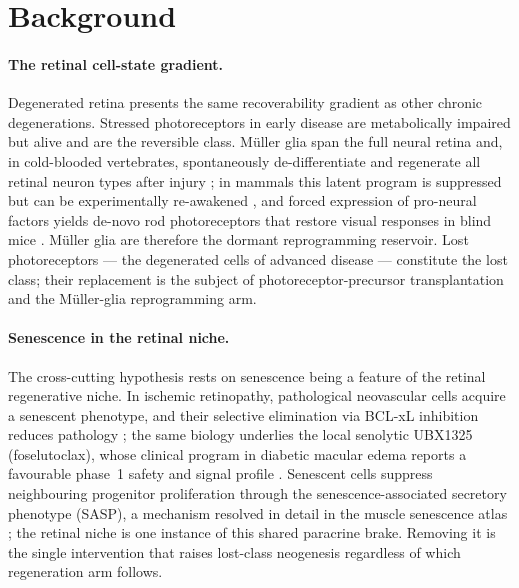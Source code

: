 \documentclass[11pt,a4paper]{article}
\begin{document}
\section{Background}
\label{sec:bg}
\paragraph{The retinal cell-state gradient.} Degenerated retina presents the same recoverability
gradient as other chronic degenerations. Stressed photoreceptors in early disease are
metabolically impaired but alive and are the reversible class. M\"uller glia span the full
neural retina and, in cold-blooded vertebrates, spontaneously de-differentiate and regenerate
all retinal neuron types after injury \citep{goldman2014}; in mammals this latent program is
suppressed but can be experimentally re-awakened \citep{karl2008,jorstad2017}, and forced
expression of pro-neural factors yields de-novo rod photoreceptors that restore visual responses
in blind mice \citep{yao2018}. M\"uller glia are therefore the dormant reprogramming reservoir.
Lost photoreceptors --- the degenerated cells of advanced disease --- constitute the lost class;
their replacement is the subject of photoreceptor-precursor transplantation
\citep{maclaren2006,ribeiro2021} and the M\"uller-glia reprogramming arm.

\paragraph{Senescence in the retinal niche.} The cross-cutting hypothesis rests on senescence
being a feature of the retinal regenerative niche. In ischemic retinopathy, pathological
neovascular cells acquire a senescent phenotype, and their selective elimination via BCL-xL
inhibition reduces pathology \citep{crespogarcia2021}; the same biology underlies the local
senolytic UBX1325 (foselutoclax), whose clinical program in diabetic macular edema reports a
favourable phase~1 safety and signal profile \citep{crespodawid2024}. Senescent cells suppress
neighbouring progenitor proliferation through the senescence-associated secretory phenotype
(SASP), a mechanism resolved in detail in the muscle senescence atlas \citep{moiseeva2023}; the
retinal niche is one instance of this shared paracrine brake. Removing it is the single
intervention that raises lost-class neogenesis regardless of which regeneration arm follows.
\end{document}
